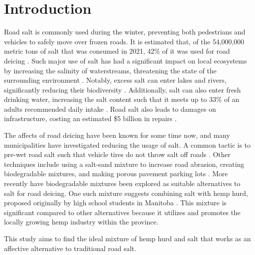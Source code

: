 \section*{Introduction}

Road salt is commonly used during the winter, preventing both pedestrians and vehicles to safely move over frozen roads.
It is estimated that, of the 54,000,000 metric tons of salt that was consumed in 2021, 42\% of it was used for road deicing \parencite{USG22}.
Such major use of salt has had a significant impact on local ecosystems by increasing the salinity of waterstreams, threatening the state of the surrounding environment \parencite{KGW20}.
Notably, excess salt can enter lakes and rivers, significantly reducing their biodiversity \parencite{HKM22}.
Additionally, salt can also enter fresh drinking water, increasing the salt content such that it meets up to 33\% of an adults recommended daily intake \parencite{CGR22}.
Road salt also leads to damages on infrastructure, costing an estimated \$5 billion in repairs \parencite{EPA20}.

The affects of road deicing have been known for some time now, and many municipalities have investigated reducing the usage of salt.
A common tactic is to pre-wet road salt such that vehicle tires do not throw salt off roads \parencites{ZAS20}{UFK17}.
Other techniques include using a salt-sand mixture to increase road abrasion, creating biodegradable mixtures, and making porous pavement parking lots \parencite{EPA20}.
More recently have biodegradable mixtures been explored as suitable alternatives to salt for road deicing.
One such mixture suggests combining salt with hemp hurd, proposed originally by high school students in Manitoba \parencite{KAV21}.
This mixture is significant compared to other alternatives because it utilizes and promotes the locally growing hemp industry within the province.

This study aims to find the ideal mixture of hemp hurd and salt that works as an affective alternative to traditional road salt.
